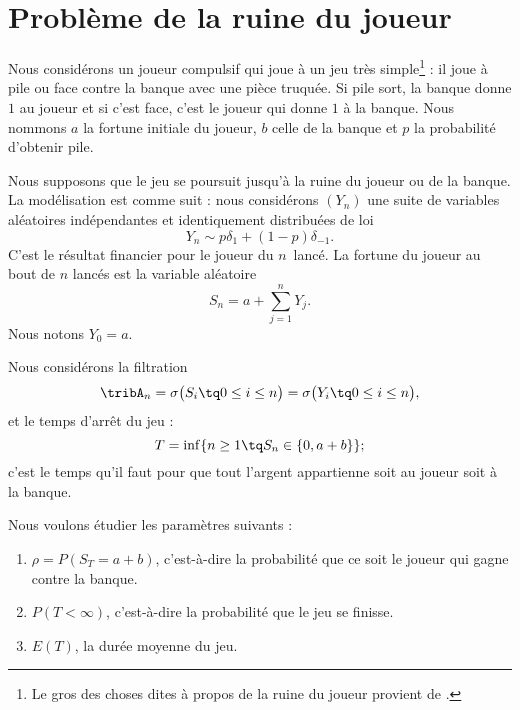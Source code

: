 \section{Problème de la ruine du joueur}
\label{SecMSOjfgM}

Nous considérons un joueur compulsif qui joue à un jeu très simple\footnote{Le gros des choses dites à propos de la ruine du joueur provient de \cite{KXjFWKA}.} : il joue à pile ou face contre la banque avec une pièce truquée. Si pile sort, la banque donne \( 1\) au joueur et si c'est face, c'est le joueur qui donne \( 1\) à la banque. Nous nommons \( a\) la fortune initiale du joueur,  \( b\) celle de la banque et \( p\) la probabilité d'obtenir pile.

Nous supposons que le jeu se poursuit jusqu'à la ruine du joueur ou de la banque. La modélisation est comme suit : nous considérons \( (Y_n)\) une suite de variables aléatoires indépendantes et identiquement distribuées de loi
\begin{equation}
    Y_n\sim p\delta_1+(1-p)\delta_{-1}.
\end{equation}
C'est le résultat financier pour le joueur du \( n\)\ieme\ lancé. La fortune du joueur au bout de \( n\) lancés est la variable aléatoire
\begin{equation}
    S_n=a+\sum_{j=1}^nY_j.
\end{equation}
Nous notons \( Y_0=a\).

Nous considérons la filtration
\begin{equation}
    \tribA_n=\sigma\big( S_i\tq 0\leq i\leq n \big)=\sigma\big( Y_i\tq 0\leq i\leq n \big),
\end{equation}
et le temps d'arrêt du jeu :
\begin{equation}
    T=\inf\{ n\geq 1\tq S_n\in\{ 0,a+b \} \};
\end{equation}
c'est le temps qu'il faut pour que tout l'argent appartienne soit au joueur soit à la banque.

Nous voulons étudier les paramètres suivants :
\begin{enumerate}
    \item
        \( \rho=P(S_T=a+b)\), c'est-à-dire la probabilité que ce soit le joueur qui gagne contre la banque.
    \item
        \( P(T<\infty)\), c'est-à-dire la probabilité que le jeu se finisse.
    \item
        \( E(T)\), la durée moyenne du jeu.
\end{enumerate}

